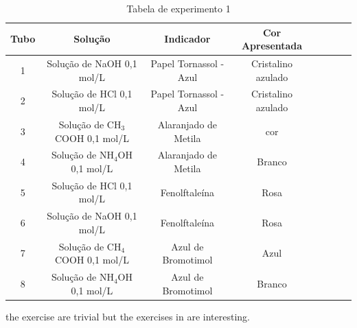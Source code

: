 \documentclass[a4paper, 11pt]{article}
\begin{document}
        \begin{table}[h]\label{tab:tubos}
            \label{tab:experimento1}
            \centering
            \begin{tabular}{|c|c|c|c|c|c|c|c|}
                \hline
                \textbf{Tubo} & \textbf{Solução} & \textbf{Indicador} & \textbf{Cor Apresentada}\\
                \hline
                1 & Solução de NaOH 0,1 mol/L & Papel Tornassol - Azul & Cristalino azulado \\
                \hline
                2 & Solução de HCl 0,1 mol/L & Papel Tornassol - Azul & Cristalino azulado \\
                \hline
                3 & Solução de CH$_3$COOH 0,1 mol/L & Alaranjado de Metila & cor\\
                \hline
                4 & Solução de NH$_4$OH 0,1 mol/L & Alaranjado de Metila & Branco \\
                \hline
                5 & Solução de HCl 0,1 mol/L & Fenolftaleína & Rosa \\
                \hline
                6 & Solução de NaOH 0,1 mol/L & Fenolftaleína & Rosa \\
                \hline
                7 & Solução de CH$_4$COOH 0,1 mol/L & Azul de Bromotimol & Azul \\
                \hline
                8 & Solução de NH$_4$OH 0,1 mol/L & Azul de Bromotimol & Branco \\
                \hline
            \end{tabular}
            \caption{Tabela de experimento 1}
        \end{table}




    \indent the exercise \cite{atalho} are trivial but the exercises in \cite{atalho} are interesting.


\end{document}
